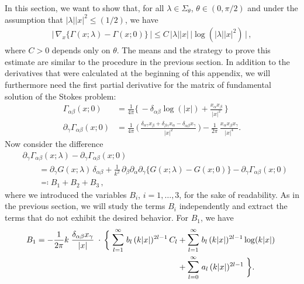 In this section, we want to show that, for all $\lambda \in \Sigma_\theta$, $\theta \in (0,\pi/2)$ and under the assumption that $|\lambda| |x|^2 \leq (1/2)$, we have
\begin{align*}
  \Big|\, \nabla_x \big\{ \Gamma(x; \lambda) - \Gamma(x; 0) \big\} \, \Big| \leq C\, |\lambda| |x| \, \big|\log(|\lambda| |x|^2)\,\big|\,,
\end{align*}
where $C > 0$ depends only on $\theta$.
The means and the strategy to prove this estimate are similar to the procedure in the previous section.
In addition to the derivatives that were calculated at the beginning of this appendix, we will furthermore need the first partial derivative for the matrix of fundamental solution of the Stokes problem:
\begin{align*}
    \Gamma_{\alpha\beta}(x; 0) 
    &= \frac{1}{4\pi} \bigg\{ \,- \delta_{\alpha\beta} \log(|x|) + \frac{x_\alpha x_\beta}{|x|^2} \,\bigg\}
    \\[0.5em]
  \partial_\gamma \Gamma_{\alpha\beta} (x; 0) 
  &= \frac{1}{4 \pi}\, \bigg(\, \frac{\delta_{\alpha\gamma} x_\beta + \delta_{\beta\gamma} x_\alpha  - \delta_{\alpha\beta} x_\gamma}{|x|^2}  \, \bigg) 
  - \frac{1}{2\pi}\, \frac{x_\alpha x_\beta x_\gamma}{|x|^4} .
\end{align*}
Now consider the difference
\begin{align*}
  &\partial_\gamma \Gamma_{\alpha\beta}(x; \lambda) - \partial_\gamma \Gamma_{\alpha\beta}(x; 0) \\
  &\qquad=\partial_\gamma G(x; \lambda) \,\delta_{\alpha\beta}
  + \frac{1}{k^2} \, \partial_\beta \partial_\alpha \partial_\gamma \Big\{ G(x; \lambda) - G(x; 0) \Big\} 
  - \partial_\gamma \Gamma_{\alpha\beta}(x; 0) \\
  &\qquad\eqqcolon B_1 + B_2 + B_3 \,,
\end{align*}
where we introduced the variables $B_i$, $i = 1,\dots,3$, for the sake of readability.
As in the previous section, we will study the terms $B_i$ independently and extract the terms that do not exhibit the desired behavior.
For $B_1$, we have
\begin{align*}
  B_1 = -\frac{1}{2\pi} k\;  \frac{\delta_{\alpha\beta} x_\gamma}{|x|}  \;
  \cdot \,\bigg\{ \;
  \mathlarger{\sum}_{l = 1}^\infty \; b_l \, (k|x|)^{2l - 1} \, C_l 
  &+ \mathlarger{\sum}_{l = 1}^\infty \; b_l \, (k|x|)^{2l - 1} \log(k|x|) \; \\
  &+  \mathlarger{\sum}_{l = 0}^\infty \; a_l \, (k|x|)^{2l - 1} \; \bigg\}.
\end{align*}
